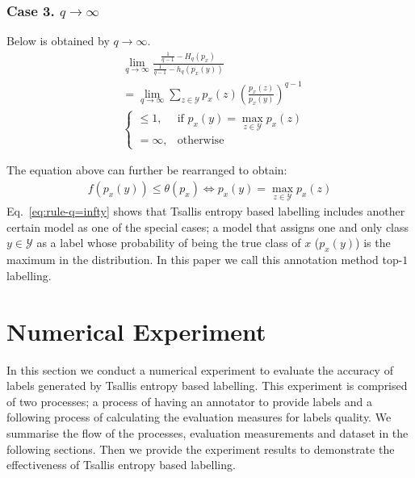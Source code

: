 \documentclass[a4paper,conference]{IEEEtran}
\begin{document}
\subsubsection{Case 3. $q \rightarrow \infty$}
Below is obtained by $q \rightarrow \infty$.
\begin{align}
    &\lim_{q \rightarrow \infty} \frac{\frac{1}{q-1}-H_{q}(p_{x})}{\frac{1}{q-1}-h_{q}(p_{x}(y))}\nonumber\\
    &=\lim_{q \rightarrow \infty} \sum_{z \in \mathcal{Y}} p_{x}(z) \left(\frac{p_{x}(z)}{p_{x}(y)}\right)^{q-1}\nonumber\\
    &
    \begin{cases}
    \le 1, & \text{if~}p_{x}(y) = \max_{z\in\mathcal{Y}}p_{x}(z)\\
    = \infty, & \text{otherwise}
    \end{cases}
\end{align}

The equation above can further be rearranged to obtain: 
\begin{align}
    f(p_{x}(y)) \le \theta(p_{x}) \Leftrightarrow p_{x}(y) = \max_{z \in \mathcal{Y}}p_{x}(z)\label{eq:rule-q=infty}
\end{align}
Eq.~\eqref{eq:rule-q=infty} shows that Tsallis entropy based labelling includes another certain model as one of the special cases; a model that assigns one and only class $y \in \mathcal{Y}$ as a label whose probability of being the true class of $x$ ($p_{x}(y)$) is the maximum in the distribution.
In this paper we call this annotation method top-$1$ labelling.

\section{Numerical Experiment}\label{sec:numerical_experiment}
In this section we conduct a numerical experiment to evaluate the accuracy of labels generated by Tsallis entropy based labelling.
This experiment is comprised of two processes; a process of having an annotator to provide labels and a following process of calculating the evaluation measures for labels quality.
We summarise the flow of the processes, evaluation measurements and dataset in the following sections.
Then we provide the experiment results to demonstrate the effectiveness of Tsallis entropy based labelling.
\end{document}
